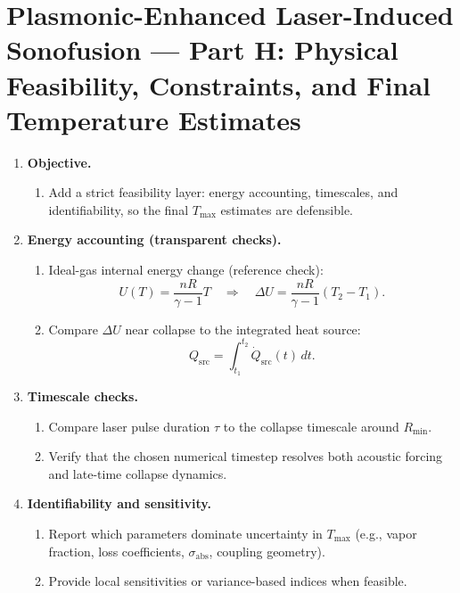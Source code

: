\documentclass[11pt]{article}
\begin{document}
	\newpage
	
	\section{Plasmonic-Enhanced Laser-Induced Sonofusion --- Part H: Physical Feasibility, Constraints, and Final Temperature Estimates}
	\begin{enumerate}
		\item \textbf{Objective.}
		\begin{enumerate}
			\item Add a strict feasibility layer: energy accounting, timescales, and identifiability, so the final $T_{\max}$ estimates are defensible.
		\end{enumerate}
		
		\item \textbf{Energy accounting (transparent checks).}
		\begin{enumerate}
			\item Ideal-gas internal energy change (reference check):
			\[
			U(T)=\dfrac{nR}{\gamma-1}T
			\quad\Rightarrow\quad
			\Delta U=\dfrac{nR}{\gamma-1}(T_2-T_1).
			\]
			\item Compare $\Delta U$ near collapse to the integrated heat source:
			\[
			Q_{\mathrm{src}}=\int_{t_1}^{t_2}\dot Q_{\mathrm{src}}(t)\,dt.
			\]
		\end{enumerate}
		
		\item \textbf{Timescale checks.}
		\begin{enumerate}
			\item Compare laser pulse duration $\tau$ to the collapse timescale around $R_{\min}$.
			\item Verify that the chosen numerical timestep resolves both acoustic forcing and late-time collapse dynamics.
		\end{enumerate}
		
		\item \textbf{Identifiability and sensitivity.}
		\begin{enumerate}
			\item Report which parameters dominate uncertainty in $T_{\max}$ (e.g., vapor fraction, loss coefficients, $\sigma_{\mathrm{abs}}$, coupling geometry).
			\item Provide local sensitivities or variance-based indices when feasible.
		\end{enumerate}
		

\end{enumerate}
\end{document}
